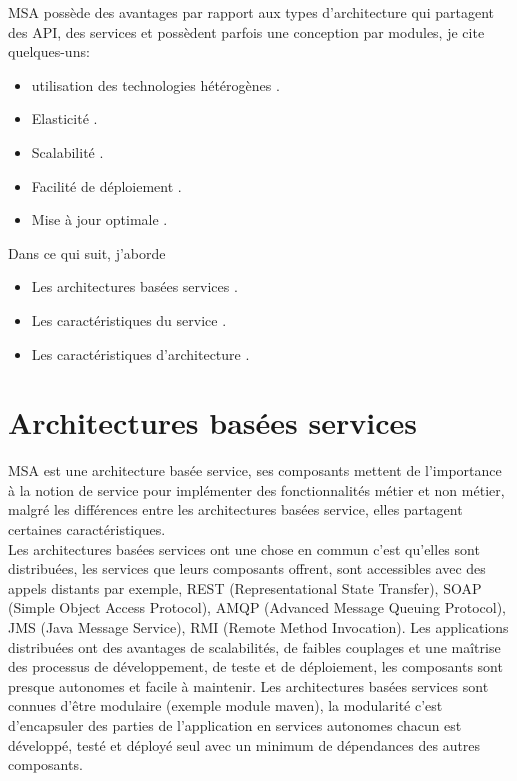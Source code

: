 \documentclass[12pt, a4paper, openany]{report}
\begin{document}
    MSA possède des avantages par rapport aux types d'architecture qui partagent des API, des services et possèdent parfois une conception par modules, je cite quelques-uns:  
                                                \begin{itemize}
                                                 \item utilisation des technologies hétérogènes .
                                                 \item Elasticité .
                                                 \item Scalabilité .
                                                 \item Facilité de déploiement .
                                                 \item Mise à jour optimale .
                                                \end{itemize}
   
   Dans ce qui suit, j'aborde  
                                                \begin{itemize}
                                                 \item Les architectures basées services .
                                                 \item Les caractéristiques du service .
                                                 \item Les caractéristiques d'architecture .
                                                \end{itemize}
                                                      
 \section{Architectures basées services}
  MSA est une architecture basée service, ses composants mettent de l’importance à la notion de service pour implémenter des fonctionnalités métier et non métier, malgré les différences entre les architectures basées service, elles partagent certaines caractéristiques.\\
 
 Les architectures basées services ont une chose en commun c’est qu’elles sont distribuées, les services que leurs composants offrent, sont accessibles avec des appels distants par exemple, REST (Representational State Transfer), SOAP (Simple Object Access Protocol), AMQP (Advanced Message Queuing Protocol), JMS (Java Message Service), RMI (Remote Method Invocation). Les applications distribuées ont des avantages de scalabilités, de faibles couplages et une maîtrise des processus de développement, de teste et de déploiement, les composants sont presque autonomes et facile à maintenir. Les architectures basées services sont connues d’être modulaire (exemple module maven), la modularité c’est d’encapsuler des parties de l’application en services autonomes chacun est développé, testé et déployé seul avec un minimum de dépendances des autres composants.\\
 
\end{document}
